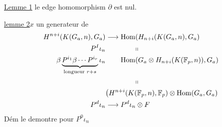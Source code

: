 \uline{Lemme 1} le edge homomorphism $\partial$ est nul.

\uline{lemme 2}\qquad $x$ un generateur de
\[
\begin{aligned}
H^{n+i}(K(G_a,n),G_a)&\longrightarrow\operatorname{Hom}(H_{n+i}(K(G_a,n),G_a)\\
P^I\iota_n&\hspace{4em}\shortparallel\\
\beta\underbrace{P^{i_1}\beta\cdots P^{i_r}}_{\text{longueur }r+s}\iota_n
 &\qquad\operatorname{Hom}(G_a\otimes H_{n+i}(K(\mathbb F_p,n)),G_a)\\
&\hspace{4em}\shortparallel\\
&\big(H^{n+i}(K(\mathbb F_p,n),\mathbb F_p)\otimes\operatorname{Hom}(G_a,G_a)\\
P^d\iota_n&\longrightarrow P^d\iota_n\otimes F
\end{aligned}
\]
Dém\qquad {} le demontre pour $P^0\iota_n$

